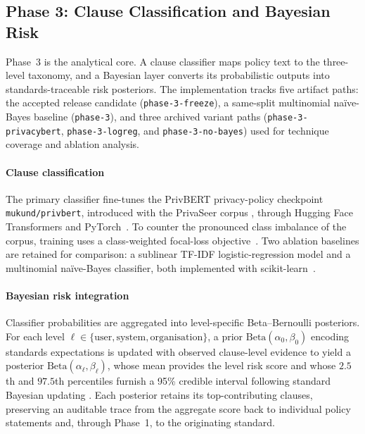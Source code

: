 \documentclass[conference]{IEEEtran}
\begin{document}
\subsection{Phase 3: Clause Classification and Bayesian Risk}\label{sec:phase3}
Phase~3 is the analytical core. A clause classifier maps policy text to the
three-level taxonomy, and a Bayesian layer converts its probabilistic outputs
into standards-traceable risk posteriors. The implementation tracks five
artifact paths: the accepted release candidate (\texttt{phase-3-freeze}),
a same-split multinomial na\"ive-Bayes baseline (\texttt{phase-3}), and
three archived variant paths (\texttt{phase-3-privacybert},
\texttt{phase-3-logreg}, and \texttt{phase-3-no-bayes}) used for technique
coverage and ablation analysis.

\paragraph{Clause classification}
The primary classifier fine-tunes the PrivBERT privacy-policy checkpoint
\texttt{mukund/privbert}, introduced with the PrivaSeer corpus
\cite{srinath2021privaseer}, through Hugging Face Transformers
\cite{wolf2020transformers} and PyTorch~\cite{paszke2019pytorch}. To counter
the pronounced class imbalance of the corpus, training uses a class-weighted
focal-loss objective~\cite{lin2017focal}. Two ablation baselines are retained
for comparison: a sublinear TF-IDF logistic-regression model and a
multinomial na\"ive-Bayes classifier, both implemented with
scikit-learn~\cite{pedregosa2011scikit}.

\paragraph{Bayesian risk integration}
Classifier probabilities are aggregated into level-specific Beta--Bernoulli
posteriors. For each level $\ell \in \{\text{user}, \text{system},
\text{organisation}\}$, a prior $\mathrm{Beta}(\alpha_0, \beta_0)$ encoding
standards expectations is updated with observed clause-level evidence to
yield a posterior $\mathrm{Beta}(\alpha_\ell, \beta_\ell)$, whose mean
provides the level risk score and whose $2.5$th and $97.5$th percentiles
furnish a 95\% credible interval following standard Bayesian updating
\cite{gelman2013bayesian}. Each posterior retains its top-contributing
clauses, preserving an auditable trace from the aggregate score back to
individual policy statements and, through Phase~1, to the originating
standard.
\end{document}
